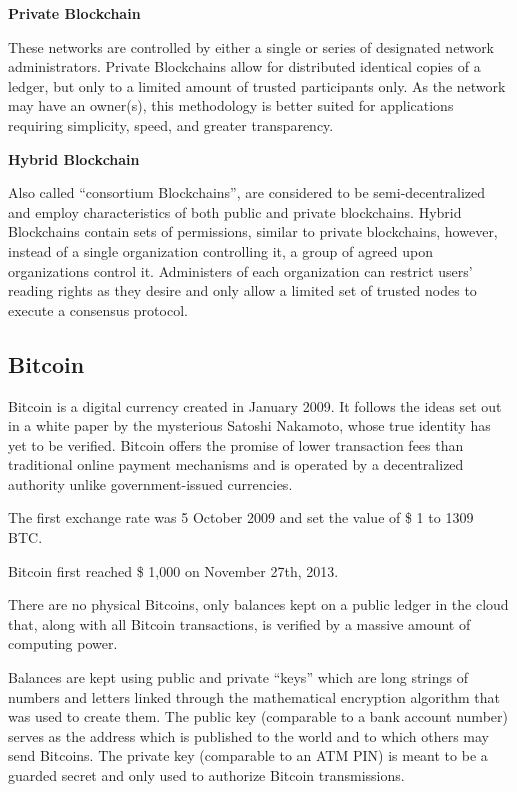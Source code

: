 \documentclass[11pt]{article}
\begin{document}
    \textbf{Private Blockchain}

These networks are controlled by either a single or series of designated
network administrators. Private Blockchains allow for distributed
identical copies of a ledger, but only to a limited amount of trusted
participants only. As the network may have an owner(s), this methodology
is better suited for applications requiring simplicity, speed, and
greater transparency.

    \textbf{Hybrid Blockchain}

Also called ``consortium Blockchains'', are considered to be
semi-decentralized and employ characteristics of both public and private
blockchains. Hybrid Blockchains contain sets of permissions, similar to
private blockchains, however, instead of a single organization
controlling it, a group of agreed upon organizations control it.
Administers of each organization can restrict users' reading rights as
they desire and only allow a limited set of trusted nodes to execute a
consensus protocol.

    \hypertarget{bitcoin}{%
\subsection{Bitcoin}\label{bitcoin}}

    Bitcoin is a digital currency created in January 2009. It follows the
ideas set out in a white paper by the mysterious Satoshi Nakamoto, whose
true identity has yet to be verified. Bitcoin offers the promise of
lower transaction fees than traditional online payment mechanisms and is
operated by a decentralized authority unlike government-issued
currencies.

    The first exchange rate was 5 October 2009 and set the value of \$ 1 to
1309 BTC.

    Bitcoin first reached \$ 1,000 on November 27th, 2013.

    There are no physical Bitcoins, only balances kept on a public ledger in
the cloud that, along with all Bitcoin transactions, is verified by a
massive amount of computing power.

    Balances are kept using public and private ``keys'' which are long
strings of numbers and letters linked through the mathematical
encryption algorithm that was used to create them. The public key
(comparable to a bank account number) serves as the address which is
published to the world and to which others may send Bitcoins. The
private key (comparable to an ATM PIN) is meant to be a guarded secret
and only used to authorize Bitcoin transmissions.
\end{document}
